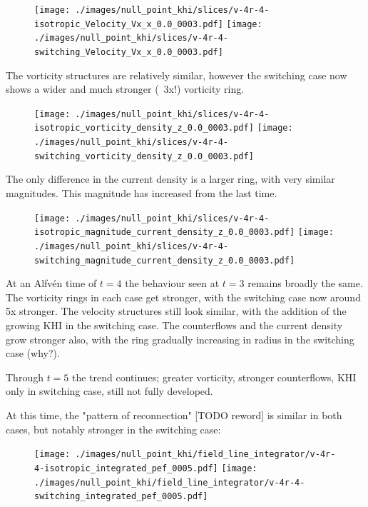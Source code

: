 \begin{figure}[H]
  \centering
  \texttt{[image: ./images/null\_point\_khi/slices/v-4r-4-isotropic\_Velocity\_Vx\_x\_0.0\_0003.pdf]}
  \texttt{[image: ./images/null\_point\_khi/slices/v-4r-4-switching\_Velocity\_Vx\_x\_0.0\_0003.pdf]}
\end{figure}

The vorticity structures are relatively similar, however the switching case now shows a wider and much stronger (~3x!) vorticity ring.

\begin{figure}[H]
  \centering
  \texttt{[image: ./images/null\_point\_khi/slices/v-4r-4-isotropic\_vorticity\_density\_z\_0.0\_0003.pdf]}
  \texttt{[image: ./images/null\_point\_khi/slices/v-4r-4-switching\_vorticity\_density\_z\_0.0\_0003.pdf]}
\end{figure}

The only difference in the current density is a larger ring, with very similar magnitudes. This magnitude has increased from the last time.

\begin{figure}[H]
  \centering
  \texttt{[image: ./images/null\_point\_khi/slices/v-4r-4-isotropic\_magnitude\_current\_density\_z\_0.0\_0003.pdf]}
  \texttt{[image: ./images/null\_point\_khi/slices/v-4r-4-switching\_magnitude\_current\_density\_z\_0.0\_0003.pdf]}
\end{figure}

At an Alfv\'en time of $t=4$ the behaviour seen at $t=3$ remains  broadly the same. The vorticity rings in each case get stronger, with the switching case now around 5x stronger. The velocity structures still look similar, with the addition of the growing KHI in the switching case. The counterflows and the current density grow stronger also, with the ring gradually increasing in radius in the switching case (why?).

Through $t=5$ the trend continues; greater vorticity, stronger counterflows, KHI only in switching case, still not fully developed.

At this time, the "pattern of reconnection" [TODO reword] is similar in both cases, but notably stronger in the switching case:

\begin{figure}[H]
  \centering
  \texttt{[image: ./images/null\_point\_khi/field\_line\_integrator/v-4r-4-isotropic\_integrated\_pef\_0005.pdf]}
  \texttt{[image: ./images/null\_point\_khi/field\_line\_integrator/v-4r-4-switching\_integrated\_pef\_0005.pdf]}
\end{figure}

